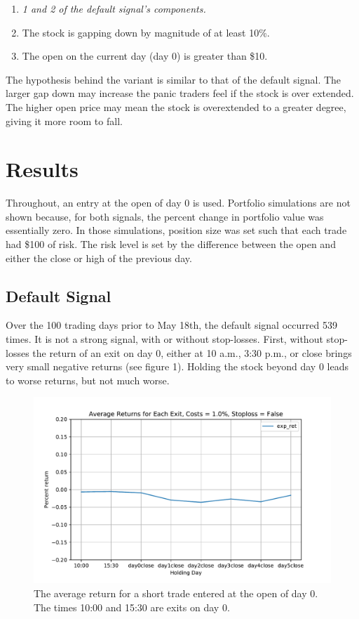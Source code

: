 \documentclass{article}
\begin{document}
\begin{enumerate}
	\item \textit{1 and 2 of the default signal's components.}
	\item The stock is gapping down by magnitude of at least 10\%. 
	\item The open on the current day (day 0) is greater than \$10.
\end{enumerate}

The hypothesis behind the variant is similar to that of the default signal. The larger gap down may increase the panic traders feel if the stock is over extended. The higher open price may mean the stock is overextended to a greater degree, giving it more room to fall.

\section{Results}

Throughout, an entry at the open of day 0 is used. Portfolio simulations are not shown because, for both signals, the percent change in portfolio value was essentially zero. In those simulations, position size was set such that each trade had \$100 of risk. The risk level is set by the difference between the open and either the close or high of the previous day.

\subsection{Default Signal}

Over the 100 trading days prior to May 18th, the default signal occurred 539 times. It is not a strong signal, with or without stop-losses. First, without stop-losses the return of an exit on day 0, either at 10 a.m., 3:30 p.m., or close brings very small negative returns (see figure 1). Holding the stock beyond day 0 leads to worse returns, but not much worse. 

\begin{figure}[!h]
\includegraphics[width=\linewidth]{avg_ret_no_stop_def.pdf}
\caption{The average return for a short trade entered at the open of day 0. The times 10:00 and 15:30 are exits on day 0.}
\end{figure}
\end{document}
